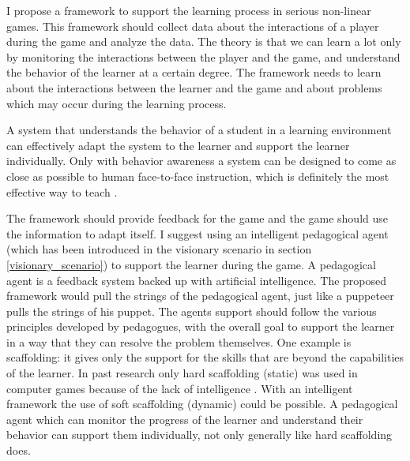 I propose a framework to support the learning process in serious non-linear
games. This framework should collect data about the interactions of a player
during the game and analyze the data. The theory is that we can learn a lot only
by monitoring the interactions between the player and the game, and understand
the behavior of the learner at a certain degree. The framework needs to learn about
the interactions between the learner and the game and about problems which may occur
during the learning process.

A system that understands the behavior of a student in a learning environment
can effectively adapt the system to the learner and support the learner
individually. Only with behavior awareness a system can be designed to come as
close as possible to human face-to-face instruction, which is definitely the
most effective way to teach \cite{Skinner1984a}.

The framework should provide feedback for the game and the game should use the
information to adapt itself. I suggest using an intelligent pedagogical
agent (which has been introduced in the visionary scenario in section
\ref{visionary_scenario}) to support the learner during the game. A
pedagogical agent is a feedback system backed up with
artificial intelligence. The proposed framework would pull the strings of the
pedagogical agent, just like a puppeteer pulls the strings of his puppet. The agents
support should follow the various principles developed by pedagogues, with
the overall goal to support the learner in a way that they can resolve the problem
themselves. One example is scaffolding: it gives only the support for the skills that are beyond the
capabilities of the learner. In past research only hard scaffolding (static)
was used in computer games because of the lack of intelligence
\cite{Brush2002b}. With an intelligent framework
the use of soft scaffolding (dynamic) could be possible. A pedagogical agent
which can monitor the progress of the learner and understand their behavior can support
them individually, not only generally like hard scaffolding does.




